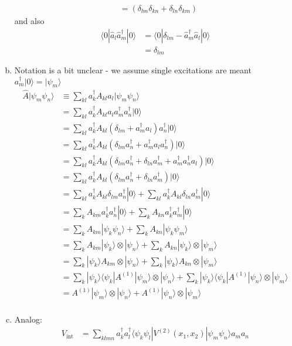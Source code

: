 \documentclass[../main.tex]{subfiles}
\begin{document}
\begin{enumerate}[(a)]
\begin{align}
&=(\delta_{lm}\delta_{kn}+\delta_{ln}\delta_{km})
\end{align}
and also 
\begin{align}
\langle0|\hat{a}_l\hat{a}^\dagger_m|0\rangle
&=\langle0|\delta_{lm}-\hat{a}^\dagger_m\hat{a}_l|0\rangle\\
&=\delta_{lm}
\end{align}
\item Notation is a bit unclear - we assume single excitations are meant $a^\dagger_m|0\rangle=|\psi_m\rangle$ 
\begin{align}
\hat{A}|\psi_m\psi_n\rangle
&\equiv\sum_{kl}a^\dagger_k A_{kl} a_l|\psi_m\psi_n\rangle\\
&=\sum_{kl} a^\dagger_k A_{kl} a_la^\dagger_m a^\dagger_n|0\rangle\\
&=\sum_{kl}a^\dagger_k A_{kl} (\delta_{lm}+a^\dagger_ma_l) a^\dagger_n|0\rangle\\
&=\sum_{kl} a^\dagger_k A_{kl} (\delta_{lm} a^\dagger_n+ a^\dagger_m a_l a^\dagger_n) |0\rangle\\
&=\sum_{kl} a^\dagger_k A_{kl} (\delta_{lm} a^\dagger_n+\delta_{ln} a^\dagger_m+a^\dagger_m a^\dagger_n a_l) |0\rangle\\
&=\sum_{kl} a^\dagger_k A_{kl} (\delta_{lm} a^\dagger_n+\delta_{ln} a^\dagger_m) |0\rangle\\
&=\sum_{kl} a^\dagger_k A_{kl} \delta_{lm} a^\dagger_n |0\rangle+\sum_{kl} a^\dagger_k A_{kl} \delta_{ln} a^\dagger_m |0\rangle\\
&=\sum_{k} A_{km} a^\dagger_k a^\dagger_n |0\rangle+\sum_{k} A_{kn}a^\dagger_k   a^\dagger_m |0\rangle\\
&=\sum_{k} A_{km} |\psi_k\psi_n\rangle+\sum_{k} A_{kn} |\psi_k\psi_m\rangle\\
&=\sum_{k} A_{km} |\psi_k\rangle\otimes|\psi_n\rangle+\sum_{k} A_{kn} |\psi_k\rangle\otimes|\psi_m\rangle\\
&=\sum_{k} |\psi_k\rangle A_{km} \otimes|\psi_n\rangle+\sum_{k} |\psi_k\rangle A_{kn} \otimes|\psi_m\rangle\\
&=\sum_{k} |\psi_k\rangle\langle\psi_k| A^{(1)}|\psi_m\rangle \otimes|\psi_n\rangle+\sum_{k} |\psi_k\rangle \langle\psi_k|A^{(1)}|\psi_n\rangle \otimes|\psi_m\rangle\\
&= A^{(1)}|\psi_m\rangle \otimes|\psi_n\rangle
+A^{(1)}|\psi_n\rangle \otimes|\psi_m\rangle\\
\end{align}

\item Analog:
\begin{align}
V_\text{int}&=\sum_{klmn} a^\dagger_k a^\dagger_l \langle\psi_k\psi_l|V^{(2)}(x_1,x_2)|\psi_m\psi_n\rangle a_m a_n
\end{align}


\end{enumerate}
\end{document}
